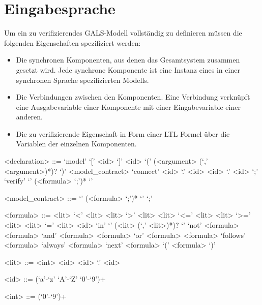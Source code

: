 \section{Eingabesprache}
Um ein zu verifizierendes GALS-Modell vollständig zu definieren müssen die folgenden Eigenschaften spezifiziert werden:
\begin{itemize}
\item Die synchronen Komponenten, aus denen das Gesamtsystem zusammen gesetzt wird.
  Jede synchrone Komponente ist eine Instanz eines in einer synchronen Sprache spezifizierten Modells.
\item Die Verbindungen zwischen den Komponenten.
  Eine Verbindung verknüpft eine Ausgabevariable einer Komponente mit einer Eingabevariable einer anderen.
\item Die zu verifizierende Eigenschaft in Form einer LTL Formel über die Variablen der einzelnen Komponenten.
\end{itemize}

\begin{grammar}
  <declaration> ::= `model' `[' <id> `]' <id> `(' (<argument> (`,' <argument>)*)? `)' <model_contract>
  \alt `connect' <id> `.' <id> <id> `.' <id> `;'
  \alt `verify' `{' (<formula> `;')* `}'

  <model_contract> ::= `{' (<formula> `;')* `}'
  \alt `;'

  <formula> ::= <lit> `<' <lit>
  \alt <lit> `>' <lit>
  \alt <lit> `<=' <lit>
  \alt <lit> `>=' <lit>
  \alt <lit> `=' <lit>
  \alt <id> `in' `{' (<lit> (`,' <lit>)*)? `}'
  \alt `not' <formula>
  \alt <formula> `and' <formula>
  \alt <formula> `or' <formula>
  \alt <formula> `follows' <formula>
  \alt `always' <formula>
  \alt `next' <formula>
  \alt `(' <formula> `)'

  <lit> ::= <int>
  \alt <id>
  \alt <id> `.' <id>
  
  <id> ::= (`a'-`z' `A'-`Z' `0'-`9')+

  <int> ::= (`0'-`9')+
\end{grammar}
